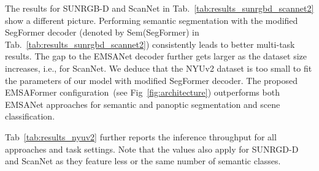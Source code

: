 \documentclass[conference]{IEEEtran}
\begin{document}
The results for SUNRGB-D and ScanNet in Tab.~\ref{tab:results_sunrgbd_scannet2} show a different picture.
Performing semantic segmentation with the modified SegFormer decoder (denoted by Sem(SegFormer) in Tab.~\ref{tab:results_sunrgbd_scannet2}) consistently leads to better multi-task results.
The gap to the EMSANet decoder further gets larger as the dataset size increases, i.e., for ScanNet.
We deduce that the NYUv2 dataset is too small to fit the parameters of our model with modified SegFormer decoder.
The proposed EMSAFormer configuration~(see Fig~\ref{fig:architecture}) outperforms both EMSANet approaches for semantic and panoptic segmentation and scene classification.

Tab~\ref{tab:results_nyuv2} further reports the inference throughput for all approaches and task settings.
Note that the values also apply for SUNRGD-D and ScanNet as they feature less or the same number of semantic classes.
\end{document}
